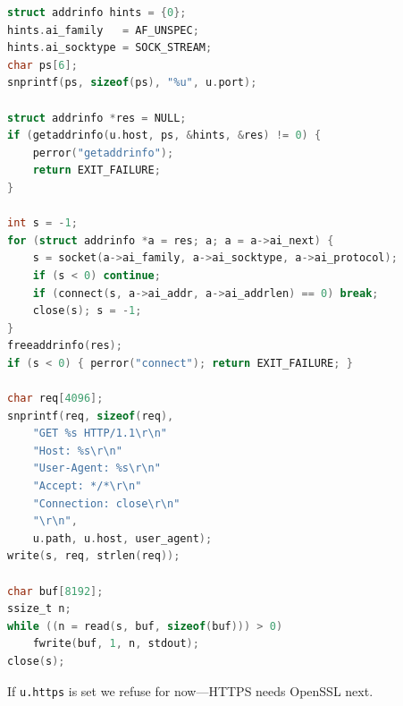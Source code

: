 \begin{lstlisting}[style=snippet,language=C]
struct addrinfo hints = {0};
hints.ai_family   = AF_UNSPEC;
hints.ai_socktype = SOCK_STREAM;
char ps[6];
snprintf(ps, sizeof(ps), "%u", u.port);

struct addrinfo *res = NULL;
if (getaddrinfo(u.host, ps, &hints, &res) != 0) {
    perror("getaddrinfo");
    return EXIT_FAILURE;
}

int s = -1;
for (struct addrinfo *a = res; a; a = a->ai_next) {
    s = socket(a->ai_family, a->ai_socktype, a->ai_protocol);
    if (s < 0) continue;
    if (connect(s, a->ai_addr, a->ai_addrlen) == 0) break;
    close(s); s = -1;
}
freeaddrinfo(res);
if (s < 0) { perror("connect"); return EXIT_FAILURE; }

char req[4096];
snprintf(req, sizeof(req),
    "GET %s HTTP/1.1\r\n"
    "Host: %s\r\n"
    "User-Agent: %s\r\n"
    "Accept: */*\r\n"
    "Connection: close\r\n"
    "\r\n",
    u.path, u.host, user_agent);
write(s, req, strlen(req));

char buf[8192];
ssize_t n;
while ((n = read(s, buf, sizeof(buf))) > 0)
    fwrite(buf, 1, n, stdout);
close(s);
\end{lstlisting}

If \texttt{u.https} is set we refuse for now---HTTPS needs OpenSSL next.

